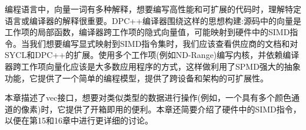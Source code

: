 
编程语言中，向量一词有多种解释，想要编写高性能和可扩展的代码时，理解特定语言或编译器的解释很重要。DPC++编译器围绕这样的思想构建:源码中的向量是工作项的局部函数，编译器跨工作项的隐式向量值，可能映射到硬件中的SIMD指令。当我们想要编写显式映射到SIMD指令集时，我们应该查看供应商的文档和对SYCL和DPC++的扩展。使用多个工作项(例如ND-Range)编写内核，并依赖编译器跨工作项向量化应该是大多数应用程序的方式，这样做利用了SPMD强大的抽象功能，它提供了一个简单的编程模型，提供了跨设备和架构的可扩展性。\par

本章描述了vec接口，想要对类似类型的数据进行操作(例如，一个具有多个颜色通道的像素)时，它提供了开箱即用的便利。本章还简要介绍了硬件中的SIMD指令，以便在第15和16章中进行更详细的讨论。\par

\newpage